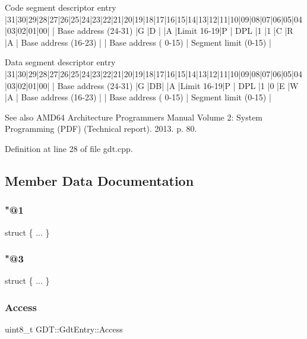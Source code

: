 \begin{DoxyVerb}Code segment descriptor entry
|31|30|29|28|27|26|25|24|23|22|21|20|19|18|17|16|15|14|13|12|11|10|09|08|07|06|05|04|03|02|01|00|
| Base address (24-31)  |G |D |  |A |Limit 16-19|P | DPL |1 |1 |C |R |A | Base address (16-23)  |
| Base address ( 0-15)                          |                         Segment limit (0-15)  |

Data segment descriptor entry
|31|30|29|28|27|26|25|24|23|22|21|20|19|18|17|16|15|14|13|12|11|10|09|08|07|06|05|04|03|02|01|00|
| Base address (24-31)  |G |DB|  |A |Limit 16-19|P | DPL |1 |0 |E |W |A | Base address (16-23)  |
| Base address ( 0-15)                          |                         Segment limit (0-15)  |
\end{DoxyVerb}
 \begin{DoxySeeAlso}{See also}
A\+M\+D64 Architecture Programmer\textquotesingle{}s Manual Volume 2\+: System Programming (P\+DF) (Technical report). 2013. p. 80. 
\end{DoxySeeAlso}


Definition at line 28 of file gdt.\+cpp.



\subsection{Member Data Documentation}
\mbox{\label{union_g_d_t_1_1_gdt_entry_ab665b6ef68844c06d13c79f7b1d01fd1}} 
\subsubsection{\texorpdfstring{"@1}{@1}}
{\footnotesize\ttfamily struct \{ ... \} }

\mbox{\label{union_g_d_t_1_1_gdt_entry_a269676ff24ab8fa05e0b639a2f7052ab}} 
\subsubsection{\texorpdfstring{"@3}{@3}}
{\footnotesize\ttfamily struct \{ ... \} }

\mbox{\label{union_g_d_t_1_1_gdt_entry_a9e362a6b3aad509ffc6620df7d3bca21}} 
\subsubsection{\texorpdfstring{Access}{Access}}
{\footnotesize\ttfamily uint8\+\_\+t G\+D\+T\+::\+Gdt\+Entry\+::\+Access}



